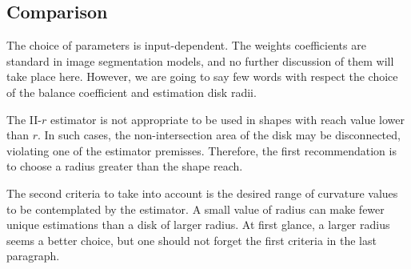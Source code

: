 \subsection{Comparison}

The choice of parameters is input-dependent. The weights coefficients are standard in image segmentation models, and no further discussion of them will take place here. However, we are going to say few words with respect the choice of the balance coefficient and estimation disk radii.

The II-$r$ estimator is not appropriate to be used in shapes with reach value lower than $r$. In such cases, the non-intersection area of the disk may be disconnected, violating one of the estimator premisses. Therefore, the first recommendation is to choose a radius greater than the shape reach.

The second criteria to take into account is the desired range of curvature values to be contemplated by the estimator. A small value of radius can make fewer unique estimations than a disk of larger radius. At first glance, a larger radius seems a better choice, but one should not forget the first criteria in the last paragraph.


\newcommand\segComparisonGF[2]{figures/chapter9/segmentation/comparison/#1/#2/alpha-0.0002/beta-1.0/gamma-3.0/radius-7}
\newcommand\segComparisonFF[2]{figures/chapter9/segmentation/comparison/#1/#2/alpha-0.5/beta-1.0/gamma-3.0/radius-7}
\newcommand\segComparisonScho[2]{figures/chapter9/segmentation/comparison/#1/lambda-2.0/gamma-1.0/#2}

